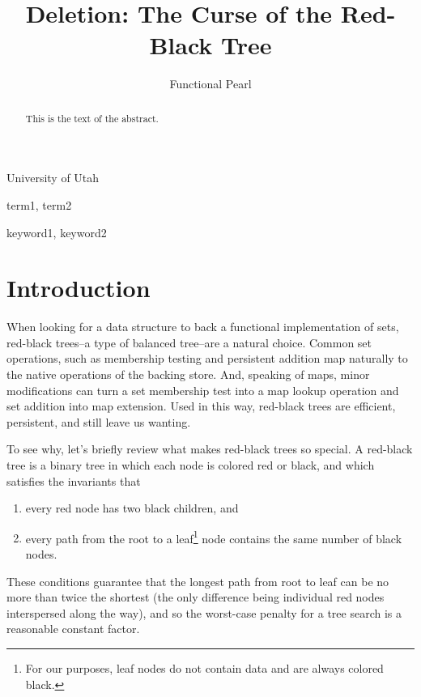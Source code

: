 \documentclass[preprint]{sigplanconf}
\begin{document}
\copyrightdata{[to be supplied]} 


\title{Deletion: The Curse of the Red-Black Tree}
\subtitle{Functional Pearl}

           {University of Utah}

\maketitle

\begin{abstract}
This is the text of the abstract.
\end{abstract}


\terms
term1, term2

\keywords
keyword1, keyword2

\section{Introduction}

When looking for a data structure to back a functional implementation of sets, red-black trees--a type of balanced tree--are a natural choice. Common set operations, such as membership testing and persistent addition map naturally to the native operations of the backing store. And, speaking of maps, minor modifications can turn a set membership test into a map lookup operation and set addition into map extension. Used in this way, red-black trees are efficient, persistent, and still leave us wanting.

To see why, let's briefly review what makes red-black trees so special. A red-black tree is a binary tree in which each node is colored red or black, and which satisfies the invariants that
\begin{enumerate}
\item every red node has two black children, and
\item every path from the root to a leaf\footnote{For our purposes, leaf nodes do not contain data and are always colored black.} node contains the same number of black nodes.
\end{enumerate}
These conditions guarantee that the longest path from root to leaf can be no more than twice the shortest (the only difference being individual red nodes interspersed along the way), and so the worst-case penalty for a tree search is a reasonable constant factor.
\end{document}
